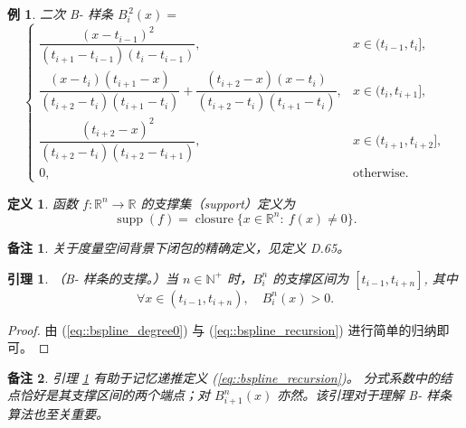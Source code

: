 \documentclass[a4paper]{ctexart}
\newtheorem{remark}{备注}
\newtheorem{definition}[theorem]{定义} %
\newtheorem{lemma}[theorem]{引理}
\newtheorem{example}[theorem]{例}
\numberwithin{theorem}{section}
\numberwithin{equation}{section}
\numberwithin{figure}{section}
\numberwithin{remark}{section}
\begin{document}
\begin{example}
    \label{ex::quadratic_bspline_formula}
二次 B- 样条 $B^{\,2}_i(x)=$
\begin{equation}
\label{eq::quadratic_bspline}
\begin{cases}
\dfrac{(x-t_{i-1})^{2}}{(t_{i+1}-t_{i-1})(t_i-t_{i-1})}, & x\in(t_{i-1},t_i],\\[8pt]
\dfrac{(x-t_i)(t_{i+1}-x)}{(t_{i+2}-t_i)(t_{i+1}-t_i)}
+\dfrac{(t_{i+2}-x)(x-t_i)}{(t_{i+2}-t_i)(t_{i+1}-t_i)}, & x\in(t_i,t_{i+1}],\\[8pt]
\dfrac{(t_{i+2}-x)^{2}}{(t_{i+2}-t_i)(t_{i+2}-t_{i+1})}, & x\in(t_{i+1},t_{i+2}],\\[8pt]
0, & \text{otherwise}.
\end{cases}
\end{equation}
\end{example}

\begin{definition}
    \label{def::support_function}
函数 $f:\mathbb{R}^{n}\to\mathbb{R}$ 的支撑集（support）定义为
\begin{equation}
\label{eq::support_def}
\operatorname{supp}(f)=\operatorname{closure}\{x\in\mathbb{R}^{n}:\ f(x)\ne 0\}.
\end{equation}
\end{definition}

\begin{remark}
    \label{rem::closure_precise}
关于度量空间背景下闭包的精确定义，见定义 D.65。
\end{remark}

\begin{lemma}
    \label{lem::support_bspline}
（B- 样条的支撑。）当 $n\in\mathbb{N}^{+}$ 时，$B^{n}_i$ 的支撑区间为 $[t_{i-1},t_{i+n}]$, 其中
\begin{equation}
\label{eq::support_positive}
\forall x\in(t_{i-1},t_{i+n}),\quad B^{n}_i(x)>0.
\end{equation}
\end{lemma}

\begin{proof}
由 (\ref{eq::bspline_degree0}) 与 (\ref{eq::bspline_recursion}) 进行简单的归纳即可。
\end{proof}

\begin{remark}
    \label{rem::memorize_recursion}
引理 \ref{lem::support_bspline} 有助于记忆递推定义 (\ref{eq::bspline_recursion})。
分式系数中的结点恰好是其支撑区间的两个端点；对 $B^{n}_{i+1}(x)$ 亦然。该引理对于理解 B- 样条算法也至关重要。
\end{remark}
\end{document}
